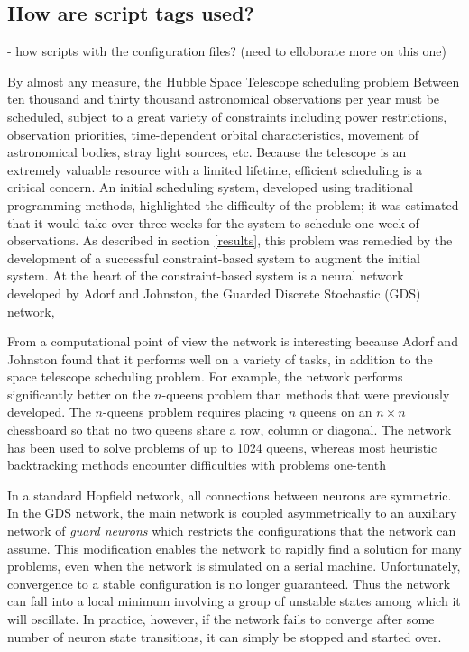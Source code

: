 \documentclass[twoside,12pt,titlepage,a4paper]{article}
\begin{document}
\vspace*{-0.05in}
\subsection{How are script tags used?}
\vspace*{-0.05in}

- how scripts with the configuration files? (need to elloborate more on this one)










By almost any measure, the Hubble Space Telescope scheduling problem
Between ten thousand and thirty thousand 
astronomical observations per year must be scheduled,
subject to a great
variety of constraints including
power restrictions, observation priorities,  
time-dependent orbital characteristics, 
movement of astronomical bodies, stray
light sources, etc. Because the telescope is an extremely
valuable resource with a limited lifetime, efficient scheduling
is a critical concern. An initial scheduling system, developed
using traditional programming methods,
highlighted the difficulty of the problem;
it was estimated that it would take over three
weeks for the system to schedule one
week of observations. As described in section \ref{results},
this problem was remedied by 
the development
of a successful constraint-based system to augment the initial system.
At the heart of the constraint-based system
is a neural network developed by Adorf and Johnston, 
the Guarded Discrete Stochastic (GDS) network,

From a computational point of view the network is interesting because
Adorf and Johnston found that it performs well on a variety of tasks,
in addition to the space telescope scheduling problem. For example,
the network performs significantly better on the $n$-queens problem
than methods that were previously developed.  The $n$-queens problem
requires placing $n$ queens on an $n \times n$ chessboard so that no
two queens share a row, column or diagonal.  The network has been used
to solve problems of up to 1024 queens, whereas most heuristic
backtracking methods encounter difficulties with problems one-tenth

In a standard Hopfield network, all connections between neurons are
symmetric. In the GDS network, the main network is coupled
asymmetrically to an auxiliary network of {\em guard neurons} which
restricts the configurations that the network can assume.  This
modification enables the network to rapidly find a solution for many
problems, even when the network is simulated on a serial machine.  
Unfortunately, convergence to a stable configuration is no
longer guaranteed.  Thus the network can fall into a local minimum
involving a group of unstable states among which it will oscillate.
In practice, however, if the network fails to converge after some
number of neuron state transitions, it can simply be stopped and
started over.
\end{document}
